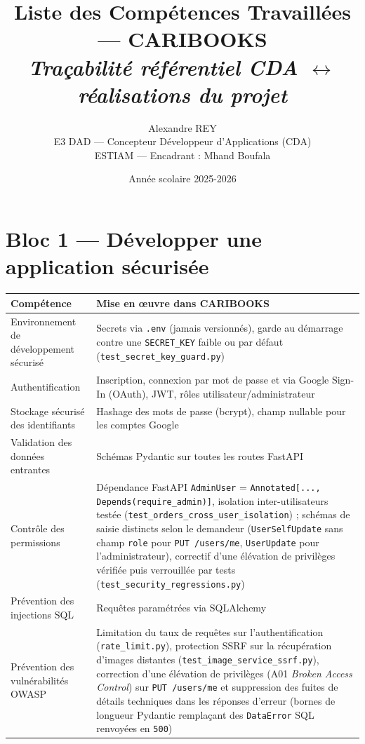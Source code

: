 \documentclass[10pt, a4paper]{article}
\title{\textbf{Liste des Compétences Travaillées — CARIBOOKS}\\[4pt]
\large\textit{Traçabilité référentiel CDA $\leftrightarrow$ réalisations du projet}}
\author{Alexandre REY \\ E3 DAD — Concepteur Développeur d'Applications (CDA) \\ ESTIAM — Encadrant : Mhand Boufala}
\date{Année scolaire 2025-2026}
\begin{document}
\maketitle
\thispagestyle{fancy}


\section{Bloc 1 — Développer une application sécurisée}

\begin{longtable}{@{}L{6cm}L{9.5cm}@{}}
\toprule
\textbf{Compétence} & \textbf{Mise en œuvre dans CARIBOOKS} \\
\midrule
\endhead
Environnement de développement sécurisé & Secrets via \texttt{.env} (jamais versionnés), garde au démarrage contre une \texttt{SECRET\_KEY} faible ou par défaut (\texttt{test\_secret\_key\_guard.py}) \\
Authentification & Inscription, connexion par mot de passe et via Google Sign-In (OAuth), JWT, rôles utilisateur/administrateur \\
Stockage sécurisé des identifiants & Hashage des mots de passe (bcrypt), champ nullable pour les comptes Google \\
Validation des données entrantes & Schémas Pydantic sur toutes les routes FastAPI \\
Contrôle des permissions & Dépendance FastAPI \texttt{AdminUser} = \texttt{Annotated[..., Depends(require\_admin)]}, isolation inter-utilisateurs testée (\texttt{test\_orders\_cross\_user\_isolation}) ; schémas de saisie distincts selon le demandeur (\texttt{UserSelfUpdate} sans champ \texttt{role} pour \texttt{PUT /users/me}, \texttt{UserUpdate} pour l'administrateur), correctif d'une élévation de privilèges vérifiée puis verrouillée par tests (\texttt{test\_security\_regressions.py}) \\
Prévention des injections SQL & Requêtes paramétrées via SQLAlchemy \\
Prévention des vulnérabilités OWASP & Limitation du taux de requêtes sur l'authentification (\texttt{rate\_limit.py}), protection SSRF sur la récupération d'images distantes (\texttt{test\_image\_service\_ssrf.py}), correction d'une élévation de privilèges (A01 \textit{Broken Access Control}) sur \texttt{PUT /users/me} et suppression des fuites de détails techniques dans les réponses d'erreur (bornes de longueur Pydantic remplaçant des \texttt{DataError} SQL renvoyées en \texttt{500}) \\

\end{longtable}
\end{document}
